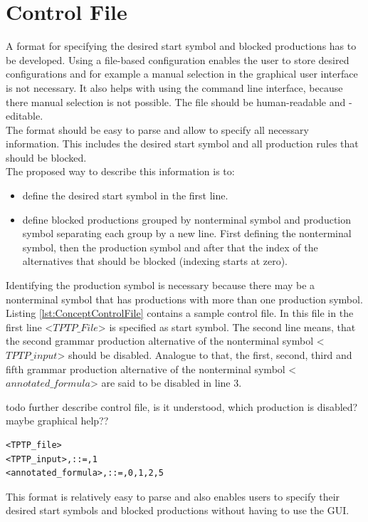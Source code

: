 \section{Control File}\label{sec:ConceptControlFile}
A format for specifying the desired start symbol and blocked productions has to be developed.
Using a file-based configuration enables the user to store desired configurations and for example a manual selection in the graphical user interface is not necessary.
It also helps with using the command line interface, because there manual selection is not possible.
The file should be human-readable and -editable.\\
The format should be easy to parse and allow to specify all necessary information.
This includes the desired start symbol and all production rules that should be blocked.\\
The proposed way to describe this information is to:

\begin{itemize}%
	\item define the desired start symbol in the first line.
	\item define blocked productions grouped by nonterminal symbol and production symbol separating each group by a new line.
	First defining the nonterminal symbol, then the production symbol and after that the index of the alternatives that should be blocked (indexing starts at zero). 
\end{itemize}
\label{itemize:ConceptControlFile}
Identifying the production symbol is necessary because there may be a nonterminal symbol that has productions with more than one production symbol.\\
Listing \ref{lst:ConceptControlFile} contains a sample control file. In this file in the first line <$TPTP\_File$> is specified as start symbol.
The second line means, that the second grammar production alternative of the nonterminal symbol <$TPTP\_input$> should be disabled.
Analogue to that, the first, second, third and fifth grammar production alternative of the nonterminal symbol <$annotated\_formula$> are said to be disabled in line 3.

todo further describe control file, is it understood, which production is disabled? maybe graphical help??
\begin{lstlisting}[caption= Example of a control file,label= lst:ConceptControlFile]
<TPTP_file>
<TPTP_input>,::=,1
<annotated_formula>,::=,0,1,2,5
\end{lstlisting}
This format is relatively easy to parse and also enables users to specify their desired start symbols and blocked productions without having to use the GUI.

